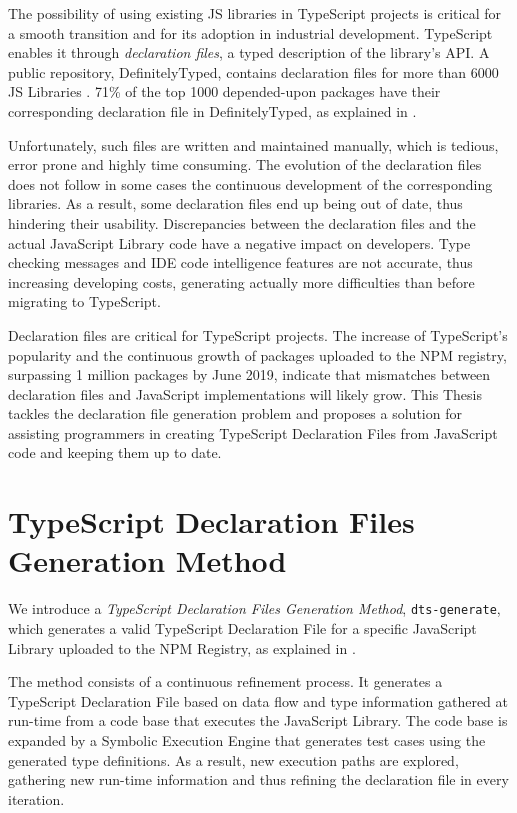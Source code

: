 The possibility of using existing JS libraries in TypeScript projects is critical for a smooth transition and for its adoption in industrial development. TypeScript enables it through \textit{declaration files}, a typed description of the library's API. A public repository, DefinitelyTyped, contains declaration files for more than 6000 JS Libraries \citep{definitely-typed-repository}. 71\% of the top 1000 depended-upon packages have their corresponding declaration file in DefinitelyTyped, as explained in .

Unfortunately, such files are written and maintained manually, which is tedious, error prone and highly time consuming. The evolution of the declaration files does not follow in some cases the continuous development of the corresponding libraries. As a result, some declaration files end up being out of date, thus hindering their usability. Discrepancies between the declaration files and the actual JavaScript Library code have a negative impact on developers. Type checking messages and IDE code intelligence features are not accurate, thus increasing developing costs, generating actually more difficulties than before migrating to TypeScript.

Declaration files are critical for TypeScript projects. The increase of TypeScript's popularity and the continuous growth of packages uploaded to the NPM registry, surpassing 1 million packages by June 2019, indicate that mismatches between declaration files and JavaScript implementations will likely grow. This Thesis tackles the declaration file generation problem and proposes a solution for assisting programmers in creating TypeScript Declaration Files from JavaScript code and keeping them up to date.

\section{TypeScript Declaration Files Generation Method}

We introduce a \textit{TypeScript Declaration Files Generation Method}, \texttt{dts-generate}, which generates a valid TypeScript Declaration File for a specific JavaScript Library uploaded to the NPM Registry, as explained in .



The method consists of a continuous refinement process. It generates a TypeScript Declaration File based on data flow and type information gathered at run-time from a code base that executes the JavaScript Library. The code base is expanded by a Symbolic Execution Engine that generates test cases using the generated type definitions. As a result, new execution paths are explored, gathering new run-time information and thus refining the declaration file in every iteration.

